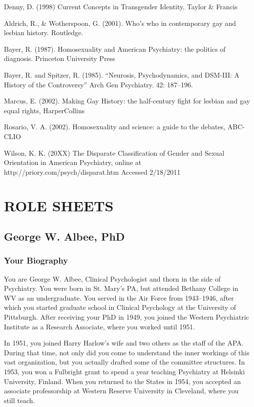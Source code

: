 Denny, D. (1998) Current Concepts in Transgender Identity, Taylor \& Francis

Aldrich, R., \& Wotherspoon, G. (2001). Who's who in contemporary gay and lesbian history. Routledge.

Bayer, R. (1987). Homosexuality and American Psychiatry: the politics of diagnosis. Princeton University Press

Bayer, R. and Spitzer, R. (1985). ``Neurosis, Psychodynamics, and DSM-III: A History of the Controversy'' Arch Gen Psychiatry. 42: 187--196.

Marcus, E. (2002). Making Gay History: the half-century fight for lesbian and gay equal rights, HarperCollins

Rosario, V. A. (2002). Homosexuality and science: a guide to the debates, ABC-CLIO

Wilson, K. K. (20XX) The Disparate Classification of Gender and Sexual Orientation in American Psychiatry, online at http:\slash \slash priory.com\slash psych\slash disparat.htm Accessed 2\slash 18\slash 2011

\pagebreak 

\part{ROLE SHEETS}
\label{rolesheets}

\chapter{George W. Albee, PhD}
\label{georgew.albeephd}

\section{Your Biography}
\label{yourbiography}

You are George W. Albee, Clinical Psychologist and thorn in the side of Psychiatry. You were born in St. Mary's PA, but attended Bethany College in WV as an undergraduate. You served in the Air Force from 1943--1946, after which you started graduate school in Clinical Psychology at the University of Pittsburgh. After receiving your PhD in 1949, you joined the Western Psychiatric Institute as a Research Associate, where you worked until 1951.

In 1951, you joined Harry Harlow's wife and two others as the staff of the APA. During that time, not only did you come to understand the inner workings of this vast organization, but you actually drafted some of the committee structures. In 1953, you won a Fulbright grant to spend a year teaching Psychiatry at Helsinki University, Finland. When you returned to the States in 1954, you accepted an associate professorship at Western Reserve University in Cleveland, where you still teach.

